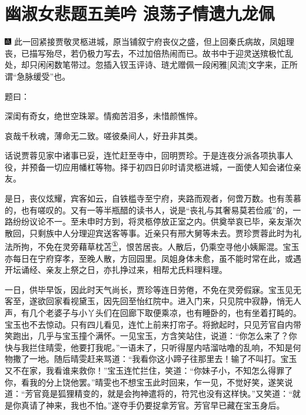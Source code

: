 

\chapter{幽淑女悲题五美吟 浪荡子情遗九龙佩}

{\includegraphics[width=3mm]{../Images/00005} \kaishu 此一回紧接贾敬灵柩进城，原当铺叙宁府丧仪之盛，但上回秦氏病故，凤姐理丧，已描写殆尽，若仍极力写去，不过加倍热闹而已。故书中于迎灵送殡极忙乱处，却只闲闲数笔带过。忽插入钗玉评诗、琏尤赠佩一段闲雅{[}风流{]}文字来，正所谓``急脉缓受''也。}

题曰：

深闺有奇女，绝世空珠翠。情痴苦泪多，未惜颜憔悴。

哀哉千秋魂，薄命无二致。嗟彼桑间人，好丑非其类。

话说贾蓉见家中诸事已妥，连忙赶至寺中，回明贾珍。于是连夜分派各项执事人役，并预备一切应用幡杠等物。择于初四日卯时请灵柩进城，一面使人知会诸位亲友。

是日，丧仪炫耀，宾客如云，自铁槛寺至宁府，夹路而观者，何啻万数。也有羡慕的，也有嗟叹的。又有一等半瓶醋的读书人，说是``丧礼与其奢易莫若俭戚''的，一路纷纷议论不一。至未申时方到，将灵柩停放正室之内。供奠举哀已毕，亲友渐次散回，只剩族中人分理迎宾送客等事。近亲只有邢大舅等未去。贾珍贾蓉此时为礼法所拘，不免在灵旁藉草枕苫\href{../Text/part0068_split_000.html\#lnkback_1_a}{\textsuperscript{①}}，恨苦居丧。人散后，仍乘空寻他小姨厮混。宝玉亦每日在宁府穿孝，至晚人散，方回园里。凤姐身体未愈，虽不能时常在此，或遇开坛诵经、亲友上祭之日，亦扎挣过来，相帮尤氏料理料理。

一日，供毕早饭，因此时天气尚长，贾珍等连日劳倦，不免在灵旁假寐。宝玉见无客至，遂欲回家看视黛玉，因先回至怡红院中。进入门来，只见院中寂静，悄无人声，有几个老婆子与小丫头们在回廊下取便乘凉，也有睡卧的，也有坐着打盹的。宝玉也不去惊动。只有四儿看见，连忙上前来打帘子。将掀起时，只见芳官自内带笑跑出，几乎与宝玉撞个满怀。一见宝玉，方含笑站住，说道：``你怎么来了？你快与我拦住晴雯，他要打我呢。''一语未了，只听得屋内咭溜咕噜的乱响，不知是何物撒了一地。随后晴雯赶来骂道：``我看你这小蹄子往那里去！输了不叫打。宝玉又不在家，我看谁来救你！''宝玉连忙拦住，笑道：``你妹子小，不知怎么得罪了你，看我的分上饶他罢。''晴雯也不想宝玉此时回来，乍一见，不觉好笑，遂笑说道：``芳官竟是狐狸精变的，就是会拘神遣将的，符咒也没有这样快。''又笑道：``就是你真请了神来，我也不怕。''遂夺手仍要捉拿芳官。芳官早已藏在宝玉身后。

